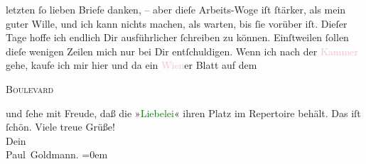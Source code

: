               letzten ſo lieben Briefe danken, – aber dieſe Arbeits-Woge iſt ſtärker, als mein
               guter Wille, und ich kann nichts machen, als warten, bis ſie vorüber iſt. Dieſer Tage
               hoffe ich endlich Dir ausführlicher ſchreiben zu können. Einſtweilen ſollen dieſe
               wenigen Zeilen mich nur bei Dir entſchuldigen. Wenn ich nach der \textcolor{pink}{Kammer}{} gehe, kaufe ich mir hier und da ein
                  \textcolor{pink}{Wien}{}\ledrightnote{\textcolor{pink}{Wien}}er Blatt auf dem \begin{otherlanguage}{french}\textsc{Boulevard}\end{otherlanguage} und ſehe mit Freude, daß die »\textcolor{green}{Liebelei}{}\ledrightnote{\textcolor{green}{Liebelei. Schauspiel in drei Akten}}«  ihren {\pb}Platz im Repertoire behält. \strikeout{\textcolor{gray}{×}\-\textcolor{gray}{×}\-\textcolor{gray}{×}\-\textcolor{gray}{×}\-\textcolor{gray}{×}} Das iſt ſchön.\pend
           \pstart
           Viele treue Grüße! {\\[\baselineskip]}Dein {\\[\baselineskip]}\spacefill\mbox{Paul Goldmann.}\pend
           \leftskip=0em{}\endnumbering{}  
      